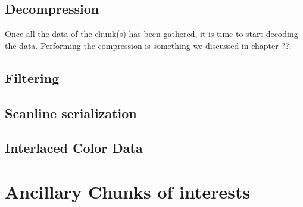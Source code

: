 \subsection{Decompression}

Once all the data of the \IDAT chunk(s) has been gathered, it is time
to start decoding the data. Performing the compression is something we
discussed in chapter ??. 

\subsection{Filtering}

\subsection{Scanline serialization}

\subsection{Interlaced Color Data}

\section{Ancillary Chunks of interests }



